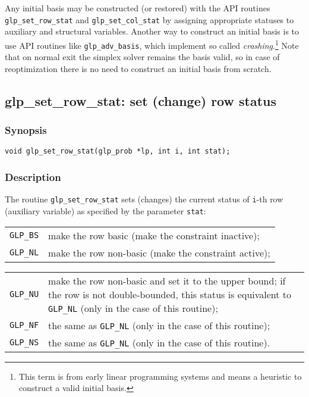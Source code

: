 Any initial basis may be constructed (or restored) with the API
routines \verb|glp_set_row_stat| and \verb|glp_set_col_stat| by
assigning appropriate statuses to auxiliary and structural variables.
Another way to construct an initial basis is to use API routines like
\verb|glp_adv_basis|, which implement so called
{\it crashing}.\footnote{This term is from early linear programming
systems and means a heuristic to construct a valid initial basis.} Note
that on normal exit the simplex solver remains the basis valid, so in
case of reoptimization there is no need to construct an initial basis
from scratch.

\subsection{glp\_set\_row\_stat: set (change) row status}

\subsubsection*{Synopsis}

\begin{verbatim}
void glp_set_row_stat(glp_prob *lp, int i, int stat);
\end{verbatim}

\subsubsection*{Description}

The routine \verb|glp_set_row_stat| sets (changes) the current status
of \verb|i|-th row (auxiliary variable) as specified by the parameter
\verb|stat|:

\begin{tabular}{@{}lp{104.2mm}@{}}
\verb|GLP_BS| & make the row basic (make the constraint inactive); \\
\verb|GLP_NL| & make the row non-basic (make the constraint active); \\
\end{tabular}

\newpage

\begin{tabular}{@{}lp{104.2mm}@{}}
\verb|GLP_NU| & make the row non-basic and set it to the upper bound;
   if the row is not double-bounded, this status is equivalent to
   \verb|GLP_NL| (only in the case of this routine); \\
\verb|GLP_NF| & the same as \verb|GLP_NL| (only in the case of this
   routine); \\
\verb|GLP_NS| & the same as \verb|GLP_NL| (only in the case of this
   routine). \\
\end{tabular}

